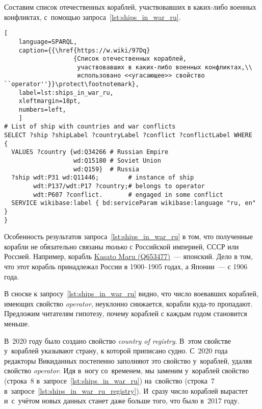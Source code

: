 Составим список отечественных кораблей, 
участвовавших в каких-либо военных конфликтах, 
с~помощью запроса~\ref{lst:ships_in_war_ru}.

\newpage
\begin{lstlisting}[ 
    language=SPARQL, 
    caption={{\href{https://w.wiki/97Dq}
                   {Список отечественных кораблей, 
                    участвовавших в каких-либо военных конфликтах,\\
                    использовано <<угасающее>> свойство ``operator''}}\protect\footnotemark}, 
    label=lst:ships_in_war_ru,
    xleftmargin=18pt, 
    numbers=left,
    ]
# List of ship with countries and war conflicts
SELECT ?ship ?shipLabel ?countryLabel ?conflict ?conflictLabel WHERE
{
  VALUES ?country {wd:Q34266 # Russian Empire
                   wd:Q15180 # Soviet Union
                   wd:Q159}  # Russia
  ?ship wdt:P31 wd:Q11446;        # instance of ship
        wdt:P137/wdt:P17 ?country;# belongs to operator
        wdt:P607 ?conflict.       # engaged in some conflict
  SERVICE wikibase:label { bd:serviceParam wikibase:language "ru, en" }
}
\end{lstlisting}

Особенность результатов запроса~\ref{lst:ships_in_war_ru} в том, 
что полученные корабли не обязательно связаны \emph{только} с Российской империей, 
СССР или Россией. 
Например, корабль \href{https://www.wikidata.org/wiki/Q653477}{Kasato Maru (Q653477)}~--- японский. 
Дело в том, что этот корабль принадлежал России в 1900--1905 годах, а Японии~--- с 1906 года.

В сноске к запросу~\ref{lst:ships_in_war_ru} видно, 
что число воевавших кораблей, имеющих свойство \emph{operator}, 
неуклонно снижается, корабли \mbox{куда-то} пропадают. 
Предложим читателям гипотезу, почему кораблей с каждым годом становится меньше. 

В~2020 году было создано свойство \emph{country of registry}. 
В~этом свойстве у~кораблей указывают страну, к которой приписано судно. 
С~2020 года редакторы Викиданных постепенно заполняют это свойство у~кораблей, 
удаляя свойство \emph{operator}.
%
Идя в~ногу со~временем, мы заменим у~кораблей свойство  
(строка~8 в~запросе~\ref{lst:ships_in_war_ru}) 
на~свойство  (строка~7 в~запросе~\ref{lst:ships_in_war_ru_registry}). 
И~сразу число кораблей вырастет и~с~учётом новых данных станет даже больше того, что было в~2017 году. 

